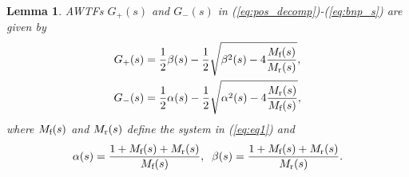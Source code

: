 \documentclass[10pt,twocolumn,twoside]{IEEEtran}
\newtheorem{lemma}{Lemma}
\theoremstyle{definition}
\begin{document}
\begin{lemma}\label{lem:AWTF}
AWTFs $G_{+}(s)$ and $G_{-}(s)$ in (\ref{eq:pos_decomp})-(\ref{eq:bnp_s}) are given by
\begin{align}
  G_{+}(s) &= \frac{1}{2}\beta(s)-\frac{1}{2}\sqrt{\beta^2(s)-4\frac{M_{\textnormal{f}}(s)} {M_{\textnormal{r}}(s)}}, \label{eq:AWTF_1}\\
  G_{-}(s) &= \frac{1}{2}\alpha(s)-\frac{1}{2}\sqrt{\alpha^2(s)-4\frac{M_{\textnormal{r}}(s)} {M_{\textnormal{f}}(s)}} \label{eq:AWTF_2},
\end{align}
where $M_{\textnormal{f}}(s)$ and $M_{\textnormal{r}}(s)$ define the system in (\ref{eq:eq1}) and
\begin{align}
\alpha(s) = \frac{1+M_{\textnormal{f}}(s)+M_{\textnormal{r}}(s)}{M_{\textnormal{f}}(s)}, \;\; \beta(s) = \frac{1+M_{\textnormal{f}}(s)+M_{\textnormal{r}}(s)}{M_{\textnormal{r}}(s)}.\label{eq:AWTF_3}
\end{align}
\end{lemma}
\end{document}
